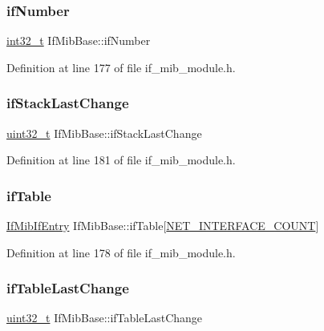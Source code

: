 \subsubsection{\texorpdfstring{if\+Number}{ifNumber}}
{\footnotesize\ttfamily \hyperlink{stdint_8h_ab1967d8591af1a4e48c37fd2b0f184d0}{int32\+\_\+t} If\+Mib\+Base\+::if\+Number}



Definition at line 177 of file if\+\_\+mib\+\_\+module.\+h.

\mbox{\label{structIfMibBase_a8426af9dacde8f376bcc4586c374cb80}} 
\subsubsection{\texorpdfstring{if\+Stack\+Last\+Change}{ifStackLastChange}}
{\footnotesize\ttfamily \hyperlink{stdint_8h_a435d1572bf3f880d55459d9805097f62}{uint32\+\_\+t} If\+Mib\+Base\+::if\+Stack\+Last\+Change}



Definition at line 181 of file if\+\_\+mib\+\_\+module.\+h.

\mbox{\label{structIfMibBase_a68d4daf12c07778493a7018d4f495252}} 
\subsubsection{\texorpdfstring{if\+Table}{ifTable}}
{\footnotesize\ttfamily \hyperlink{structIfMibIfEntry}{If\+Mib\+If\+Entry} If\+Mib\+Base\+::if\+Table\mbox{[}\hyperlink{net__config_8h_a116f850ebcb023ffa3e6b8de10c5cb35}{N\+E\+T\+\_\+\+I\+N\+T\+E\+R\+F\+A\+C\+E\+\_\+\+C\+O\+U\+NT}\mbox{]}}



Definition at line 178 of file if\+\_\+mib\+\_\+module.\+h.

\mbox{\label{structIfMibBase_a90837fc3ab805768087b0b9308e9ee2f}} 
\subsubsection{\texorpdfstring{if\+Table\+Last\+Change}{ifTableLastChange}}
{\footnotesize\ttfamily \hyperlink{stdint_8h_a435d1572bf3f880d55459d9805097f62}{uint32\+\_\+t} If\+Mib\+Base\+::if\+Table\+Last\+Change}



